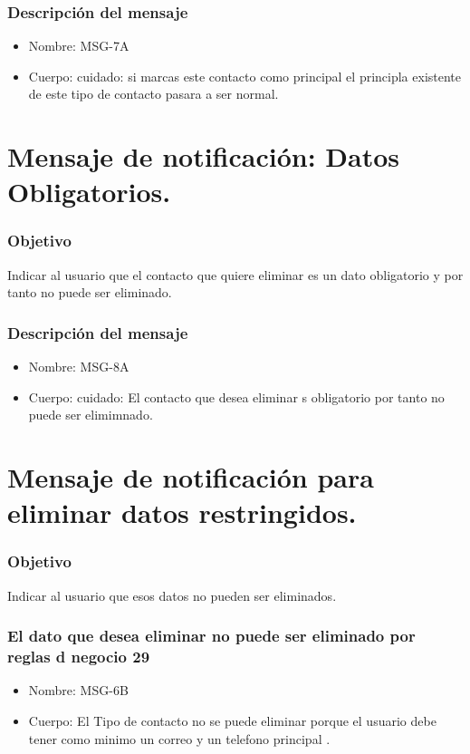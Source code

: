 \subsubsection{Descripción del mensaje}
\begin{itemize}
\item Nombre: MSG-7A
\item Cuerpo: cuidado: si marcas este contacto como principal el principla existente de este tipo de contacto pasara a ser normal.

\end{itemize}

\section{Mensaje de notificación: Datos Obligatorios.}\label{MSG8A}

\subsubsection{Objetivo}
Indicar al usuario que el contacto que quiere eliminar es un dato obligatorio y por tanto no puede ser eliminado.

\subsubsection{Descripción del mensaje}
\begin{itemize}
\item Nombre: MSG-8A
\item Cuerpo: cuidado: El contacto que desea eliminar s obligatorio por tanto no puede ser elimimnado.

\end{itemize}
\section{Mensaje de notificación para eliminar datos restringidos.}\label{MSG6B}

\subsubsection{Objetivo}
Indicar al usuario que esos datos no pueden ser eliminados.

\subsubsection{El dato que desea eliminar no puede ser eliminado por reglas d negocio 29}
\begin{itemize}
\item Nombre: MSG-6B
\item Cuerpo: El Tipo de contacto no se puede eliminar porque el usuario debe tener como minimo un correo y un telefono principal .
\end{itemize}


